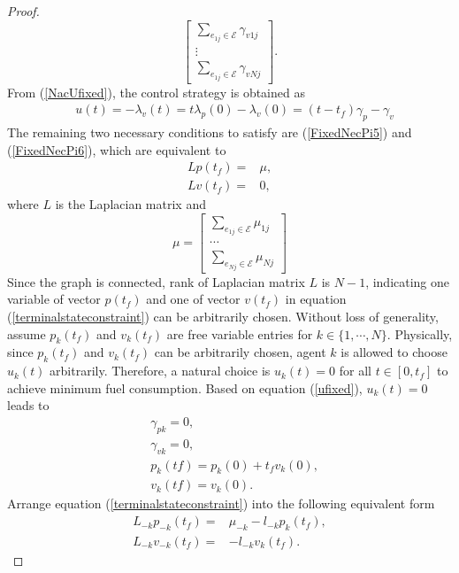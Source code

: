 \documentclass[12pt,draftcls,onecolumn]{IEEEtran}  %
\begin{document}
{\begin{proof}
\[\begin{bmatrix}
\sum_{e_{1j}\in{\mathcal{E}}}\gamma_{v1j}\\
\vdots\\
\sum_{e_{1j}\in{\mathcal{E}}}\gamma_{vNj}
\end{bmatrix}.\]
From (\ref{NacUfixed}), the control strategy is obtained as
\begin{align}
&u(t)=-\lambda_v(t)=t\lambda_p(0)-\lambda_v(0) =(t-t_f)\gamma_p-\gamma_v\label{ufixed}
\end{align}
The remaining two necessary conditions to satisfy are (\ref{FixedNecPi5}) and (\ref{FixedNecPi6}), which are equivalent to
\begin{subequations}\label{terminalstateconstraint}
\begin{align}
Lp(t_f)=&\mu,\\
Lv(t_f)=&0,
\end{align}
\end{subequations}
where $L$ is the Laplacian matrix and
\[\mu=\begin{bmatrix}
\sum_{e_{1j}\in{\mathcal{E}}}\mu_{1j}\\
\cdots\\
\sum_{e_{Nj}\in{\mathcal{E}}}\mu_{Nj}
\end{bmatrix}\]
Since the graph is connected, rank of Laplacian matrix $L$ is $N-1$, indicating one variable of vector $p(t_f)$ and one of vector $v(t_f)$ in equation (\ref{terminalstateconstraint}) can be arbitrarily chosen. Without loss of generality, assume $p_k(t_f)$ and $v_k(t_f)$ are free variable entries for $k\in\{1,\cdots,N\}$. Physically, since $p_k(t_f)$ and $v_k(t_f)$ can be arbitrarily chosen, agent $k$ is allowed to choose $u_k(t)$ arbitrarily. Therefore, a natural choice is $u_k(t)=0$ for all $t\in[0,t_f]$ to achieve minimum fuel consumption. Based on equation (\ref{ufixed}), $u_k(t)=0$ leads to
\begin{align}
&\gamma_{pk}=0, \label{gammapkfixed}\\
&\gamma_{vk}=0, \label{gammavkfixed}\\
&p_k(tf)=p_k(0)+t_fv_k(0), \label{pktf0}\\
&v_k(tf)=v_k(0). \label{vktf0}
\end{align}
Arrange equation (\ref{terminalstateconstraint}) into the following equivalent form
\begin{subequations}\label{subterminalstateconstraint}
\begin{align}
L_{-k}p_{-k}(t_f)=&\mu_{-k}-l_{-k}p_k(t_f),\\
L_{-k}v_{-k}(t_f)=&-l_{-k}v_k(t_f).
\end{align}

\end{subequations}
\end{proof}}
\end{document}
